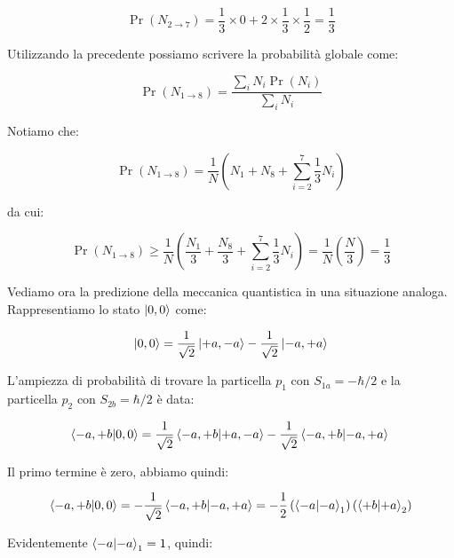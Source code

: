 	\begin{equation}
		\Pr(N_{2 \rightarrow 7}) = \frac{1}{3} \times 0 + 2 \times \frac{1}{3} \times \frac{1}{2} = \frac{1}{3}
	\end{equation}

Utilizzando la precedente possiamo scrivere la probabilit\`a globale come:

	\begin{equation}
		\Pr(N_{1 \rightarrow 8}) = \frac{\sum_i N_i \Pr(N_i)}{\sum_i N_i}
	\end{equation}

Notiamo che:

	\begin{equation}
		\Pr(N_{1 \rightarrow 8}) = \frac{1}{N} \left ( N_1 + N_8 + \sum_{i=2}^7 \frac{1}{3} N_i \right )
	\end{equation}

da cui:

	\begin{equation}
		\Pr(N_{1 \rightarrow 8}) \ge \frac{1}{N} \left ( \frac{N_1}{3} + \frac{N_8}{3} + \sum_{i=2}^7 \frac{1}{3} N_i \right )
		= \frac{1}{N} \left ( \frac{N}{3} \right ) = \frac{1}{3}
	\end{equation}

Vediamo ora la predizione della meccanica quantistica in una situazione analoga. Rappresentiamo lo stato $\ket{0, 0}$ come:

	\begin{equation}
		\ket{0, 0} = \frac{1}{\sqrt{2}} \ket{+a, -a} - \frac{1}{\sqrt{2}} \ket{-a, +a}
	\end{equation}

L'ampiezza di probabilit\`a di trovare la particella $p_1$ con $S_{1a} = - \hbar /2$ e la particella $p_2$ con $S_{2b} = \hbar / 2$ \`e data:

	\begin{equation}
		\braket{-a, +b}{0, 0}  =  \frac{1}{\sqrt{2}} \braket{-a, +b}{+a, -a} - \frac{1}{\sqrt{2}} \braket{-a, +b}{-a, +a} \\
	\end{equation}

Il primo termine \`e zero, abbiamo quindi:

	\begin{equation}
		\braket{-a, +b}{0, 0} = - \frac{1}{\sqrt{2}} \braket{-a, +b}{-a, +a} = - \frac{1}{2} \left ( \braket{-a}{-a}_1 \right )
			\left( \braket{+b}{+a}_2 \right )
	\end{equation}

Evidentemente $\braket{-a}{-a}_1 = 1$, quindi:

